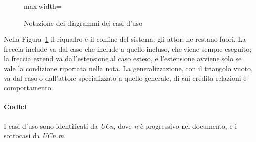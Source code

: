 \documentclass[documento]{gpt}
\newcommand{\attore}[3]{%
  \node[attorebox] (#1) at #2 {};
  \begin{scope}[shift={(#1.center)}, line width=0.7pt, draw=gptinchiostro]
    \draw[fill=white] (0,0.55) circle (0.22);
    \draw (0,0.33) -- (0,-0.35);
    \draw (-0.38,0.12) -- (0.38,0.12);
    \draw (0,-0.35) -- (-0.3,-0.85) (0,-0.35) -- (0.3,-0.85);
  \end{scope}
  \node[font=\sffamily\footnotesize, align=center, anchor=north, inner sep=2pt]
    (#1-l) at (#1.south) {#3};}
\begin{document}
\begin{figure}[H]
  \centering
  \begin{adjustbox}{max width=\linewidth}
  \end{adjustbox}
  \caption{Notazione dei diagrammi dei casi d'uso}\label{fig:legenda}
\end{figure}

Nella Figura~\ref{fig:legenda} il riquadro è il confine del sistema: gli
attori ne restano fuori. La freccia \guillemotleft include\guillemotright{} va
dal caso che include a quello incluso, che viene sempre eseguito; la freccia
\guillemotleft extend\guillemotright{} va dall'estensione al caso esteso, e
l'estensione avviene solo se vale la condizione riportata nella nota. La
generalizzazione, con il triangolo vuoto, va dal caso o dall'attore
specializzato a quello generale, di cui eredita relazioni e comportamento.

\paragraph{Codici} I casi d'uso sono identificati da \textit{UCn}, dove
\textit{n} è progressivo nel documento, e i sottocasi da \textit{UCn.m}.
\end{document}
